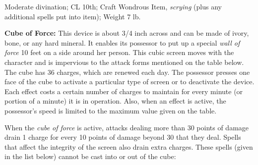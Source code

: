 Moderate divination; CL 10th; Craft Wondrous Item, \textit{scrying }(plus any additional 
spells put into item); Weight 7 lb.

\textbf{Cube of Force:} This device is about 3/4 inch across and can be made of 
ivory, bone, or any hard mineral. It enables its possessor to put up a special 
\textit{wall of force }10 feet on a side around her person. This cubic screen moves 
with the character and is impervious to the attack forms mentioned on the table 
below. The cube has 36 charges, which are renewed each day. The possessor presses 
one face of the cube to activate a particular type of screen or to deactivate the 
device. Each effect costs a certain number of charges to maintain for every minute 
(or portion of a minute) it is in operation. Also, when an effect is active, the 
possessor's speed is limited to the maximum value given on the table.

When the \textit{cube of force }is active, attacks dealing more than 30 points 
of damage drain 1 charge for every 10 points of damage beyond 30 that they deal. 
Spells that affect the integrity of the screen\textit{ }also drain extra charges. 
These spells (given in the list below) cannot be cast into or out of the cube:

